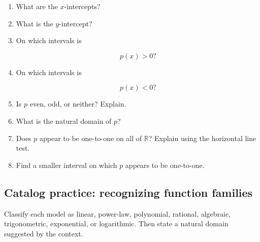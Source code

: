 \begin{enumerate}
\item What are the \(x\)-intercepts?

\item What is the \(y\)-intercept?

\item On which intervals is

\[
p(x)>0?
\]

\item On which intervals is

\[
p(x)<0?
\]

\item Is \(p\) even, odd, or neither? Explain.

\item What is the natural domain of \(p\)?

\item Does \(p\) appear to be one-to-one on all of \(\mathbb R\)? Explain using the horizontal line test.

\item Find a smaller interval on which \(p\) appears to be one-to-one.
\end{enumerate}

\subsection{Catalog practice: recognizing function families}
\label{subsec:catalog-practice}

Classify each model as linear, power-law, polynomial, rational, algebraic, trigonometric, exponential, or logarithmic. Then state a natural domain suggested by the context.

